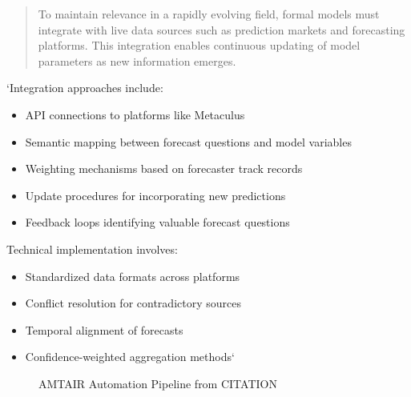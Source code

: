\documentclass[12pt,a4paper]{report}
\providecommand{\tightlist}{%
  \setlength{\itemsep}{0pt}\setlength{\parskip}{0pt}}
\begin{document}
\begin{quote}
To maintain relevance in a rapidly evolving field, formal models must
integrate with live data sources such as prediction markets and
forecasting platforms. This integration enables continuous updating of
model parameters as new information emerges.
\end{quote}

`Integration approaches include:

\begin{itemize}
\tightlist
\item
  API connections to platforms like Metaculus
\item
  Semantic mapping between forecast questions and model variables
\item
  Weighting mechanisms based on forecaster track records
\item
  Update procedures for incorporating new predictions
\item
  Feedback loops identifying valuable forecast questions
\end{itemize}

Technical implementation involves:

\begin{itemize}
\tightlist
\item
  Standardized data formats across platforms
\item
  Conflict resolution for contradictory sources
\item
  Temporal alignment of forecasts
\item
  Confidence-weighted aggregation methods`
\end{itemize}

\begin{figure}


\caption[Five-step AMTAIR automation pipeline from PDFs to Bayesian
networks]{\label{fig-automation_pipeline}AMTAIR Automation Pipeline from
CITATION}

\end{figure}%
\end{document}
